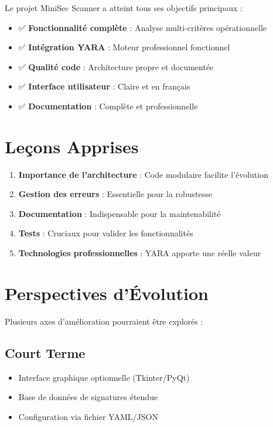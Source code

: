 \documentclass[12pt,a4paper]{report}
\begin{document}
Le projet MiniSec Scanner a atteint tous ses objectifs principaux :

\begin{itemize}
    \item ✅ \textbf{Fonctionnalité complète} : Analyse multi-critères opérationnelle
    \item ✅ \textbf{Intégration YARA} : Moteur professionnel fonctionnel
    \item ✅ \textbf{Qualité code} : Architecture propre et documentée
    \item ✅ \textbf{Interface utilisateur} : Claire et en français
    \item ✅ \textbf{Documentation} : Complète et professionnelle
\end{itemize}

\section{Leçons Apprises}

\begin{enumerate}
    \item \textbf{Importance de l'architecture} : Code modulaire facilite l'évolution
    \item \textbf{Gestion des erreurs} : Essentielle pour la robustesse
    \item \textbf{Documentation} : Indispensable pour la maintenabilité
    \item \textbf{Tests} : Cruciaux pour valider les fonctionnalités
    \item \textbf{Technologies professionnelles} : YARA apporte une réelle valeur
\end{enumerate}

\section{Perspectives d'Évolution}

Plusieurs axes d'amélioration pourraient être explorés :

\subsection{Court Terme}
\begin{itemize}
    \item Interface graphique optionnelle (Tkinter/PyQt)
    \item Base de données de signatures étendue
    \item Configuration via fichier YAML/JSON
\end{itemize}
\end{document}
